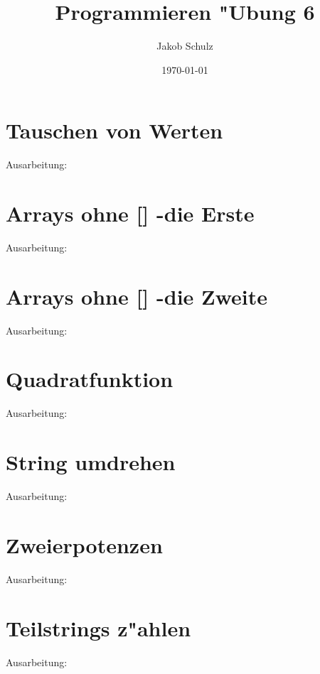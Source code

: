 \documentclass[a4paper,11pt,titlepage]{article}
\begin{document}
\title{Programmieren "Ubung 6}


\author{Jakob Schulz}


\date{\today}

\maketitle{\thispagestyle{plain}}

\section{Tauschen von Werten}
Ausarbeitung:
\newpage
\section{Arrays ohne [] -die Erste}
Ausarbeitung:
\newpage
\section{Arrays ohne [] -die Zweite}
Ausarbeitung:
\newpage
\section{Quadratfunktion}
Ausarbeitung:
\newpage
\section{String umdrehen}
Ausarbeitung:
\newpage
\section{Zweierpotenzen}
Ausarbeitung:
\newpage
\section{Teilstrings z"ahlen}
Ausarbeitung:
\newpage
\end{document}
